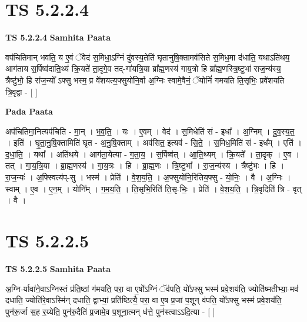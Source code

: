 \documentclass[17pt]{extarticle}
\begin{document}
\section{ TS 5.2.2.4 }

\textbf{TS 5.2.2.4 } \newline
\textbf{Samhita Paata} \newline

वप॑चितिमान् भवति॒ य ए॒वं ॅवेद॑ स॒मिधा॒ऽग्निं दु॑वस्य॒तेति॑ घृतानुषि॒क्तामव॑सिते स॒मिध॒मा द॑धाति॒ यथाऽति॑थय॒ आग॑ताय स॒र्पिष्व॑दाति॒थ्यं क्रि॒यते॑ ता॒दृगे॒व तद्-गा॑यत्रि॒या ब्रा᳚ह्म॒णस्य॑ गाय॒त्रो हि ब्रा᳚ह्म॒णस्त्रि॒ष्टुभा॑ राज॒न्य॑स्य॒ त्रैष्टु॑भो॒ हि रा॑ज॒न्यो᳚ ऽफ्सु भस्म॒ प्र वे॑शयत्य॒फ्सुयो॑नि॒र्वा अ॒ग्निः स्वामे॒वैनं॒ ॅयोनिं॑ गमयति ति॒सृभिः॒ प्रवे॑शयति त्रि॒वृद्वा - [  ] \newline

\textbf{Pada Paata} \newline

अप॑चितिमा॒नित्यप॑चिति - मा॒न् । भ॒व॒ति॒ । यः । ए॒वम् । वेद॑ । स॒मिधेति॑ सं - इधा᳚ । अ॒ग्निम् । दु॒व॒स्य॒त॒ । इति॑ । घृ॒ता॒नु॒षि॒क्तामिति॑ घृत - अ॒नु॒षि॒क्ताम् । अव॑सित॒ इत्यव॑ - सि॒ते॒ । स॒मिध॒मिति॑ सं - इध᳚म् । एति॑ । द॒धा॒ति॒ । यथा᳚ । अति॑थये । आग॑ता॒येत्या - ग॒ता॒य॒ । स॒र्पिष्व॑त् । आ॒ति॒थ्यम् । क्रि॒यते᳚ । ता॒दृक् । ए॒व । तत् । गा॒य॒त्रि॒या । ब्रा॒ह्म॒णस्य॑ । गा॒य॒त्रः । हि । ब्रा॒ह्म॒णः । त्रि॒ष्टुभा᳚ । रा॒ज॒न्य॑स्य । त्रैष्टु॑भः । हि । रा॒ज॒न्यः॑ । अ॒फ्स्वित्य॑प्-सु । भस्म॑ । प्रेति॑ । वे॒श॒य॒ति॒ । अ॒फ्सुयो॑नि॒रितिय॒फ्सु - यो॒निः॒ । वै । अ॒ग्निः । स्वाम् । ए॒व । ए॒न॒म् । योनि᳚म् । ग॒म॒य॒ति॒ । ति॒सृभि॒रिति॑ ति॒सृ-भिः॒ । प्रेति॑ । वे॒श॒य॒ति॒ । त्रि॒वृदिति॑ त्रि - वृत् । वै ।  \newline





\section{ TS 5.2.2.5 }

\textbf{TS 5.2.2.5 } \newline
\textbf{Samhita Paata} \newline

अ॒ग्नि-र्यावा॑ने॒वाऽग्निस्तं प्र॑ति॒ष्ठां ग॑मयति॒ परा॒ वा ए॒षो᳚ऽग्निं ॅव॑पति॒ यो᳚ऽफ्सु भस्म॑ प्रवे॒शय॑ति॒ ज्योति॑ष्मतीभ्या॒-मव॑ दधाति॒ ज्योति॑रे॒वाऽस्मि॑न् दधाति॒ द्वाभ्यां॒ प्रति॑ष्ठित्यै॒ परा॒ वा ए॒ष प्र॒जां प॒शून् व॑पति॒ यो᳚ऽफ्सु भस्म॑ प्रवे॒शय॑ति॒ पुन॑रू॒र्जा स॒ह र॒य्येति॒ पुन॑रु॒दैति॑ प्र॒जामे॒व प॒शूना॒त्मन् ध॑त्ते॒ पुन॑स्त्वाऽऽदि॒त्या - [  ] \newline
\end{document}
